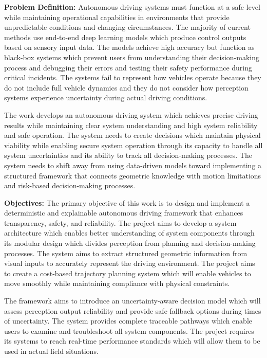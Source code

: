 \documentclass[conference]{IEEEtran}
\begin{document}
\textbf{Problem Definition:}
Autonomous driving systems must function at a safe level while maintaining operational capabilities in environments that provide unpredictable conditions and changing circumstances. The majority of current methods use end-to-end deep learning models which produce control outputs based on sensory input data. The models achieve high accuracy but function as black-box systems which prevent users from understanding their decision-making process and debugging their errors and testing their safety performance during critical incidents. The systems fail to represent how vehicles operate because they do not include full vehicle dynamics and they do not consider how perception systems experience uncertainty during actual driving conditions.

The work develops an autonomous driving system which achieves precise driving results while maintaining clear system understanding and high system reliability and safe operation. The system needs to create decisions which maintain physical viability while enabling secure system operation through its capacity to handle all system uncertainties and its ability to track all decision-making processes. The system needs to shift away from using data-driven models toward implementing a structured framework that connects geometric knowledge with motion limitations and risk-based decision-making processes.

\textbf{Objectives:}
The primary objective of this work is to design and implement a deterministic and explainable autonomous driving framework that enhances transparency, safety, and reliability. The project aims to develop a system architecture which enables better understanding of system components through its modular design which divides perception from planning and decision-making processes. The system aims to extract structured geometric information from visual inputs to accurately represent the driving environment. The project aims to create a cost-based trajectory planning system which will enable vehicles to move smoothly while maintaining compliance with physical constraints.

The framework aims to introduce an uncertainty-aware decision model which will assess perception output reliability and provide safe fallback options during times of uncertainty. The system provides complete traceable pathways which enable users to examine and troubleshoot all system components. The project requires its systems to reach real-time performance standards which will allow them to be used in actual field situations.
\end{document}
